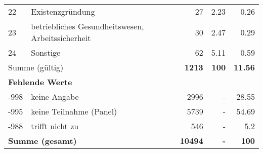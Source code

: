 \begin{longtable}{lXrrr}
        22 & \multicolumn{1}{X}{Existenzgründung} & %
          \num{27} &
          \num[round-mode=places,round-precision=2]{2,23} &
          \num[round-mode=places,round-precision=2]{0,26} \\

        23 & \multicolumn{1}{X}{betriebliches Gesundheitswesen, Arbeitssicherheit} & %
          \num{30} &
          \num[round-mode=places,round-precision=2]{2,47} &
          \num[round-mode=places,round-precision=2]{0,29} \\

        24 & \multicolumn{1}{X}{Sonstige} & %
          \num{62} &
          \num[round-mode=places,round-precision=2]{5,11} &
          \num[round-mode=places,round-precision=2]{0,59} \\

     \midrule
     \multicolumn{2}{l}{Summe (gültig)} &
       \textbf{\num{1213}} &
     \textbf{100} &
       \textbf{\num[round-mode=places,round-precision=2]{11,56}} \\
     \multicolumn{5}{l}{\textbf{Fehlende Werte}}\\
       -998 &
       keine Angabe &
         \num{2996} &
        - &
         \num[round-mode=places,round-precision=2]{28,55} \\
       -995 &
       keine Teilnahme (Panel) &
         \num{5739} &
        - &
         \num[round-mode=places,round-precision=2]{54,69} \\
       -988 &
       trifft nicht zu &
         \num{546} &
        - &
         \num[round-mode=places,round-precision=2]{5,2} \\
     \midrule
     \multicolumn{2}{l}{\textbf{Summe (gesamt)}} &
          \textbf{\num{10494}} &
        \textbf{-} &
        \textbf{100} \\
     \bottomrule
     \end{longtable}
     
